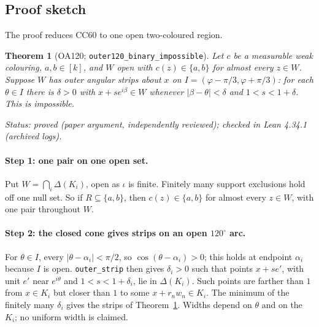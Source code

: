 \documentclass[11pt]{article}
\newtheorem{theorem}{Theorem}[section]
\theoremstyle{definition}
\theoremstyle{remark}
\begin{document}
\subsection{Proof sketch}

The proof reduces CC60 to one open two-coloured region.

\begin{theorem}[OA120; \texttt{outer120\_\allowbreak{}binary\_\allowbreak{}impossible}]\label{thm:oa120}
Let $c$ be a measurable weak colouring, $a,b\in[k]$, and $W$ open with
$c(z)\in\{a,b\}$ for almost every $z\in W$. Suppose $W$ has \emph{outer
angular strips} about $x$ on $I=(\varphi-\pi/3,\varphi+\pi/3)$: for each
$\theta\in I$ there is $\delta>0$ with $x+se^{i\beta}\in W$ whenever
$|\beta-\theta|<\delta$ and $1<s<1+\delta$. This is impossible.
\end{theorem}
\noindent\emph{Status: proved (paper argument, independently reviewed);
checked in Lean 4.34.1 (archived logs).}

\paragraph{Step 1: one pair on one open set.} Put $W=\bigcap_i\Delta(K_i)$,
open as $\iota$ is finite. Finitely many support exclusions hold off one
null set. So if $R\subseteq\{a,b\}$, then $c(z)\in\{a,b\}$ for almost every
$z\in W$, with one pair throughout $W$.

\paragraph{Step 2: the closed cone gives strips on an open $120^\circ$ arc.}
For $\theta\in I$, every $|\theta-\alpha_i|<\pi/2$, so
$\cos(\theta-\alpha_i)>0$; this holds at endpoint $\alpha_i$ because $I$ is
open. \texttt{outer\_\allowbreak{}strip} then gives $\delta_i>0$ such that points
$x+se'$, with unit $e'$ near $e^{i\theta}$ and $1<s<1+\delta_i$, lie in
$\Delta(K_i)$. Such points are farther than $1$ from $x\in K_i$ but closer
than $1$ to some $x+r_nw_n\in K_i$. The minimum of the finitely many
$\delta_i$ gives the strips of Theorem~\ref{thm:oa120}. Widths depend on
$\theta$ and on the $K_i$; no uniform width is claimed.
\end{document}
